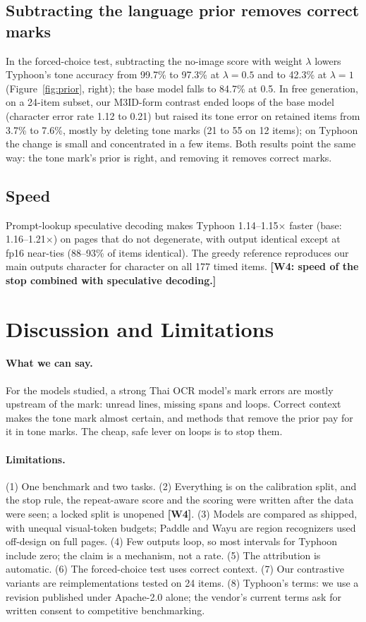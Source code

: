 \documentclass[10pt,twocolumn]{article}
\newcommand{\todo}[1]{\textcolor{red!70!black}{\textbf{[#1]}}}
\begin{document}
\subsection{Subtracting the language prior removes correct marks}
In the forced-choice test, subtracting the no-image score with weight $\lambda$ lowers Typhoon's tone accuracy from 99.7\% to 97.3\% at $\lambda=0.5$ and to 42.3\% at $\lambda=1$ (Figure~\ref{fig:prior}, right); the base model falls to 84.7\% at 0.5. In free generation, on a 24-item subset, our M3ID-form contrast ended loops of the base model (character error rate 1.12 to 0.21) but raised its tone error on retained items from 3.7\% to 7.6\%, mostly by deleting tone marks (21 to 55 on 12 items); on Typhoon the change is small and concentrated in a few items. Both results point the same way: the tone mark's prior is right, and removing it removes correct marks.

\subsection{Speed}
Prompt-lookup speculative decoding makes Typhoon 1.14--1.15$\times$ faster (base: 1.16--1.21$\times$) on pages that do not degenerate, with output identical except at fp16 near-ties (88--93\% of items identical). The greedy reference reproduces our main outputs character for character on all 177 timed items. \todo{W4: speed of the stop combined with speculative decoding.}

\section{Discussion and Limitations}
\paragraph{What we can say.} For the models studied, a strong Thai OCR model's mark errors are mostly upstream of the mark: unread lines, missing spans and loops. Correct context makes the tone mark almost certain, and methods that remove the prior pay for it in tone marks. The cheap, safe lever on loops is to stop them.

\paragraph{Limitations.} (1) One benchmark and two tasks. (2) Everything is on the calibration split, and the stop rule, the repeat-aware score and the scoring were written after the data were seen; a locked split is unopened \todo{W4}. (3) Models are compared as shipped, with unequal visual-token budgets; Paddle and Wayu are region recognizers used off-design on full pages. (4) Few outputs loop, so most intervals for Typhoon include zero; the claim is a mechanism, not a rate. (5) The attribution is automatic. (6) The forced-choice test uses correct context. (7) Our contrastive variants are reimplementations tested on 24 items. (8) Typhoon's terms: we use a revision published under Apache-2.0 alone; the vendor's current terms ask for written consent to competitive benchmarking.
\end{document}
